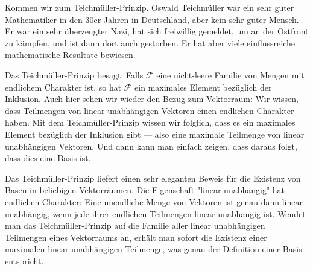 \begin{math-stroke}

\end{math-stroke}

\begin{spoken-clean}[00:58:30 - 01:00:30]
Kommen wir zum Teichmüller-Prinzip. Oswald Teichmüller war ein sehr guter Mathematiker in den 30er Jahren in Deutschland, aber kein sehr guter Mensch. Er war ein sehr überzeugter Nazi, hat sich freiwillig gemeldet, um an der Ostfront zu kämpfen, und ist dann dort auch gestorben. Er hat aber viele einflussreiche mathematische Resultate bewiesen.

Das Teichmüller-Prinzip besagt: Falls $\mathcal{F}$ eine nicht-leere Familie von Mengen mit endlichem Charakter ist, so hat $\mathcal{F}$ ein maximales Element bezüglich der Inklusion. Auch hier sehen wir wieder den Bezug zum Vektorraum: Wir wissen, dass Teilmengen von linear unabhängigen Vektoren einen endlichen Charakter haben. Mit dem Teichmüller-Prinzip wissen wir folglich, dass es ein maximales Element bezüglich der Inklusion gibt --- also eine maximale Teilmenge von linear unabhängigen Vektoren. Und dann kann man einfach zeigen, dass daraus folgt, dass dies eine Basis ist.
\end{spoken-clean}

\begin{didactic-insight}
Das Teichmüller-Prinzip liefert einen sehr eleganten Beweis für die Existenz von Basen in beliebigen Vektorräumen. Die Eigenschaft "linear unabhängig" hat endlichen Charakter: Eine unendliche Menge von Vektoren ist genau dann linear unabhängig, wenn jede ihrer endlichen Teilmengen linear unabhängig ist. Wendet man das Teichmüller-Prinzip auf die Familie aller linear unabhängigen Teilmengen eines Vektorraums an, erhält man sofort die Existenz einer maximalen linear unabhängigen Teilmenge, was genau der Definition einer Basis entspricht.
\end{didactic-insight}

